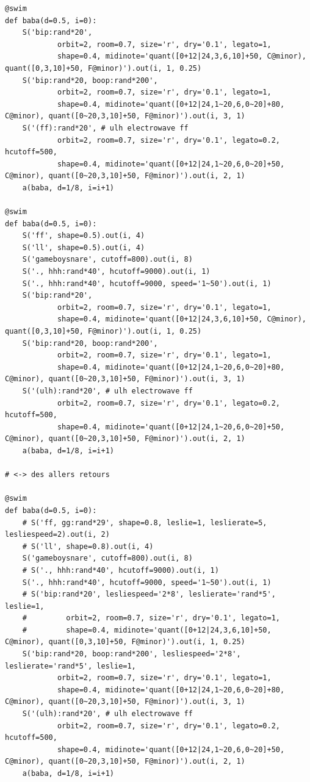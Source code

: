 \documentclass[11pt]{article}
\begin{document}
\begin{enumerate}
\begin{verbatim}
@swim
def baba(d=0.5, i=0):
    S('bip:rand*20',
            orbit=2, room=0.7, size='r', dry='0.1', legato=1,
            shape=0.4, midinote='quant([0+12|24,3,6,10]+50, C@minor), quant([0,3,10]+50, F@minor)').out(i, 1, 0.25)
    S('bip:rand*20, boop:rand*200',
            orbit=2, room=0.7, size='r', dry='0.1', legato=1,
            shape=0.4, midinote='quant([0+12|24,1~20,6,0~20]+80, C@minor), quant([0~20,3,10]+50, F@minor)').out(i, 3, 1)
    S('(ff):rand*20', # ulh electrowave ff
            orbit=2, room=0.7, size='r', dry='0.1', legato=0.2, hcutoff=500,
            shape=0.4, midinote='quant([0+12|24,1~20,6,0~20]+50, C@minor), quant([0~20,3,10]+50, F@minor)').out(i, 2, 1)
    a(baba, d=1/8, i=i+1)

@swim
def baba(d=0.5, i=0):
    S('ff', shape=0.5).out(i, 4)
    S('ll', shape=0.5).out(i, 4)
    S('gameboysnare', cutoff=800).out(i, 8)
    S('., hhh:rand*40', hcutoff=9000).out(i, 1)
    S('., hhh:rand*40', hcutoff=9000, speed='1~50').out(i, 1)
    S('bip:rand*20',
            orbit=2, room=0.7, size='r', dry='0.1', legato=1,
            shape=0.4, midinote='quant([0+12|24,3,6,10]+50, C@minor), quant([0,3,10]+50, F@minor)').out(i, 1, 0.25)
    S('bip:rand*20, boop:rand*200',
            orbit=2, room=0.7, size='r', dry='0.1', legato=1,
            shape=0.4, midinote='quant([0+12|24,1~20,6,0~20]+80, C@minor), quant([0~20,3,10]+50, F@minor)').out(i, 3, 1)
    S('(ulh):rand*20', # ulh electrowave ff
            orbit=2, room=0.7, size='r', dry='0.1', legato=0.2, hcutoff=500,
            shape=0.4, midinote='quant([0+12|24,1~20,6,0~20]+50, C@minor), quant([0~20,3,10]+50, F@minor)').out(i, 2, 1)
    a(baba, d=1/8, i=i+1)

# <-> des allers retours

@swim
def baba(d=0.5, i=0):
    # S('ff, gg:rand*29', shape=0.8, leslie=1, leslierate=5, lesliespeed=2).out(i, 2)
    # S('ll', shape=0.8).out(i, 4)
    S('gameboysnare', cutoff=800).out(i, 8)
    # S('., hhh:rand*40', hcutoff=9000).out(i, 1)
    S('., hhh:rand*40', hcutoff=9000, speed='1~50').out(i, 1)
    # S('bip:rand*20', lesliespeed='2*8', leslierate='rand*5', leslie=1,
    #         orbit=2, room=0.7, size='r', dry='0.1', legato=1,
    #         shape=0.4, midinote='quant([0+12|24,3,6,10]+50, C@minor), quant([0,3,10]+50, F@minor)').out(i, 1, 0.25)
    S('bip:rand*20, boop:rand*200', lesliespeed='2*8', leslierate='rand*5', leslie=1,
            orbit=2, room=0.7, size='r', dry='0.1', legato=1,
            shape=0.4, midinote='quant([0+12|24,1~20,6,0~20]+80, C@minor), quant([0~20,3,10]+50, F@minor)').out(i, 3, 1)
    S('(ulh):rand*20', # ulh electrowave ff
            orbit=2, room=0.7, size='r', dry='0.1', legato=0.2, hcutoff=500,
            shape=0.4, midinote='quant([0+12|24,1~20,6,0~20]+50, C@minor), quant([0~20,3,10]+50, F@minor)').out(i, 2, 1)
    a(baba, d=1/8, i=i+1)


\end{verbatim}
\end{enumerate}
\end{document}
